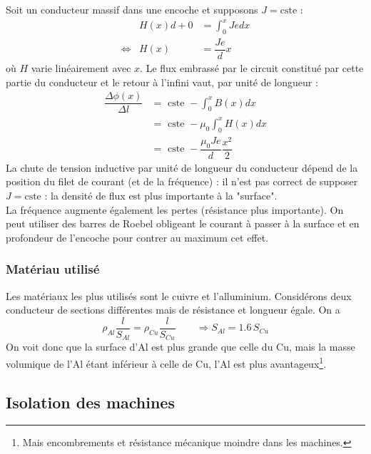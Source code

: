 	Soit un conducteur massif dans une encoche et supposons $J = \text{cste}$ :
	\begin{equation}
	\begin{array}{lll}
	
	& H(x)d + 0 &= \displaystyle\int_0^x Jedx\\
	\Leftrightarrow& H(x) &= \dfrac{Je}{d}x
	\end{array}
	\end{equation}
	où $H$ varie linéairement avec $x$. Le flux embrassé par le circuit constitué 
	par cette partie du conducteur et le retour à l’infini vaut, par unité de 
	longueur :
	\begin{equation}
	\begin{array}{ll}
	\dfrac{\Delta \phi(x)}{\Delta l} &= \text{ cste } - \int_0^x B(x)dx\\
 	&= \text{ cste } - \mu_0\int_0^x H(x) dx\\
	&= \text{ cste } - \dfrac{\mu_0Je}{d}\dfrac{x^2}{2}
	\end{array}
	\end{equation}
	La chute de tension inductive par unité de longueur du conducteur dépend de 
	la position du filet de courant (et de la fréquence) : il n'est pas correct 
	de supposer $J = \text{cste}$ : la densité de flux est plus importante à la 
	"surface".\\
	La fréquence augmente également les pertes (résistance plus importante). On 
	peut utiliser des barres de Roebel obligeant le courant à passer à la surface 
	et en profondeur de l'encoche pour contrer au maximum cet effet.
	
	\subsubsection{Matériau utilisé}
	Les matériaux les plus utilisés sont le cuivre et l'alluminium. Considérons deux conducteur de sections différentes mais de résistance et longueur égale. On a
	\begin{equation}
		\rho _{Al}\frac{l}{S_{Al}} = \rho _{Cu}\frac{l}{S_{Cu}} \qquad \Rightarrow S_{Al} = 1.6 \, S_{Cu}
	\end{equation}
	On voit donc que la surface d'Al est plus grande que celle du Cu, mais la masse volumique de l'Al étant inférieur à celle de Cu, l'Al est plus avantageux\footnote{Mais encombrements et résistance mécanique moindre dans les machines.}. 
	
	\subsection{Isolation des machines}
